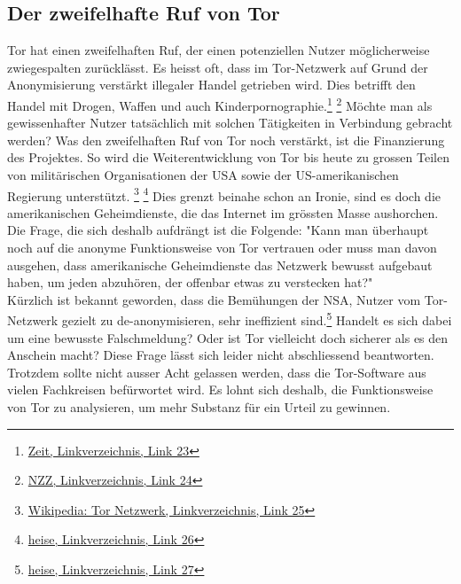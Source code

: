 \subsection{Der zweifelhafte Ruf von Tor}
Tor hat einen zweifelhaften Ruf, der einen potenziellen Nutzer möglicherweise zwiegespalten zurücklässt.
Es heisst oft, dass im Tor-Netzwerk auf Grund der Anonymisierung verstärkt illegaler Handel getrieben wird.
Dies betrifft den Handel mit Drogen, Waffen und auch Kinderpornographie.\footnote{\hyperlink{link23}{Zeit, Linkverzeichnis, Link 23}} \footnote{\hyperlink{link24}{NZZ, Linkverzeichnis, Link 24}}
Möchte man als gewissenhafter Nutzer tatsächlich mit solchen Tätigkeiten in Verbindung gebracht werden?
Was den zweifelhaften Ruf von Tor noch verstärkt, ist die Finanzierung des Projektes.
So wird die Weiterentwicklung von Tor bis heute zu grossen Teilen von militärischen Organisationen der USA sowie der US-amerikanischen Regierung  unterstützt.
\footnote{\hyperlink{link25}{Wikipedia: Tor Netzwerk, Linkverzeichnis, Link 25}}
\footnote{\hyperlink{link26}{heise, Linkverzeichnis, Link 26}}
Dies grenzt beinahe schon an Ironie, sind es doch die amerikanischen Geheimdienste, die das Internet im grössten Masse aushorchen. Die Frage, die sich deshalb aufdrängt ist die Folgende: "Kann man überhaupt noch auf die anonyme Funktionsweise von Tor vertrauen oder muss man davon ausgehen, dass amerikanische Geheimdienste das Netzwerk bewusst aufgebaut haben, um jeden abzuhören, der offenbar etwas zu verstecken hat?"
\\
Kürzlich ist bekannt geworden, dass die Bemühungen der NSA, Nutzer vom Tor-Netzwerk gezielt zu de-anonymisieren, sehr ineffizient sind.\footnote{\hyperlink{link27}{heise, Linkverzeichnis, Link 27}}
Handelt es sich dabei um eine bewusste Falschmeldung? Oder ist Tor vielleicht doch sicherer als es den Anschein macht? Diese Frage lässt sich leider nicht abschliessend beantworten. Trotzdem sollte nicht ausser Acht gelassen werden, dass die Tor-Software aus vielen Fachkreisen befürwortet wird. Es lohnt sich deshalb, die Funktionsweise von Tor zu analysieren, um mehr Substanz für ein Urteil zu gewinnen.


